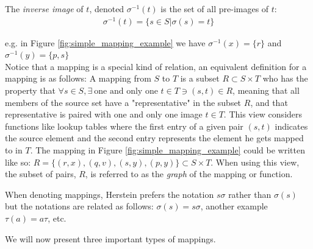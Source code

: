 \begin{definition}
The \textit{inverse image} of $t$, denoted $\sigma^{-1}(t)$ is the set of all pre-images of $t$:
\begin{align}
    \sigma^{-1}(t)=\{s\in S | \sigma(s)=t \}\nonumber
\end{align}
\end{definition}
e.g. in Figure \ref{fig:simple_mapping_example} we have $\sigma^{-1}(x)=\{r\}$ and
$\sigma^{-1}(y)=\{p,s\}$\\
Notice that a mapping is a special kind of relation,\label{note:mapping-as-relation} an equivalent definition for a mapping is as
follows: A mapping from $S$ to $T$ is a subset $R\subset S \times T$ who has the property that
$\forall s \in S, \exists \ \text{one and only one } t\in T \ni (s,t)\in R$, meaning that all
members of the source set have a "representative" in the subset $R$, and that representative is
paired with one and only one image $t\in T$. This view considers functions like lookup tables where
the first entry of a given pair $(s,t)$ indicates the source element and the second entry represents
the element he gets mapped to in $T$. The mapping in Figure \ref{fig:simple_mapping_example} could
be written like so: $R=\{(r,x),(q,v),(s,y),(p,y)\} \subset S\times T$. When using this view, the
subset of pairs, $R$, is referred to as the \textit{graph} of the mapping or function.
\begin{notation}
When denoting mappings, Herstein prefers the notation $s\sigma$ rather than $\sigma(s)$ but the
notations are related as follows: $\sigma(s) = s\sigma$, another example $\tau(a)=a\tau$, etc.
\end{notation}

\noindent We will now present three important types of mappings.

